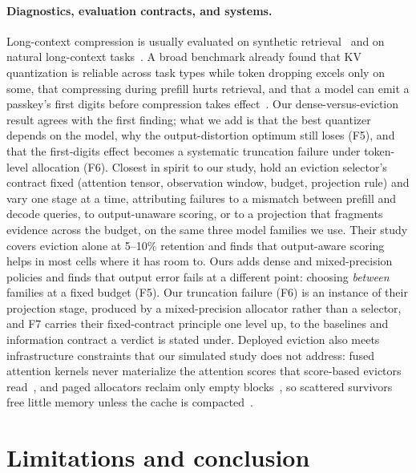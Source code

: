 \documentclass{article}
\theoremstyle{definition}
\begin{document}
\paragraph{Diagnostics, evaluation contracts, and systems.}
Long-context compression is usually evaluated on synthetic retrieval~\citep{hsieh2024ruler} and on natural long-context tasks~\citep{bai2025longbenchv2}.  A broad benchmark already found that KV quantization is reliable across task types while token dropping excels only on some, that compressing during prefill hurts retrieval, and that a model can emit a passkey's first digits before compression takes effect~\citep{yuan2024kvbench}.  Our dense-versus-eviction result agrees with the first finding; what we add is that the best quantizer depends on the model, why the output-distortion optimum still loses (F5), and that the first-digits effect becomes a systematic truncation failure under token-level allocation (F6).  Closest in spirit to our study, \citet{zhang2026fixedcontract} hold an eviction selector's contract fixed (attention tensor, observation window, budget, projection rule) and vary one stage at a time, attributing failures to a mismatch between prefill and decode queries, to output-unaware scoring, or to a projection that fragments evidence across the budget, on the same three model families we use.  Their study covers eviction alone at 5--10\% retention and finds that output-aware scoring helps in most cells where it has room to.  Ours adds dense and mixed-precision policies and finds that output error fails at a different point: choosing \emph{between} families at a fixed budget (F5).  Our truncation failure (F6) is an instance of their projection stage, produced by a mixed-precision allocator rather than a selector, and F7 carries their fixed-contract principle one level up, to the baselines and information contract a verdict is stated under.  Deployed eviction also meets infrastructure constraints that our simulated study does not address: fused attention kernels never materialize the attention scores that score-based evictors read~\citep{dao2023flashattention2,shah2024flashattention3,zhang2024sageattention}, and paged allocators reclaim only empty blocks~\citep{kwon2023vllm}, so scattered survivors free little memory unless the cache is compacted~\citep{mao2026triattention}.

\section{Limitations and conclusion}
\label{sec:conclusion}
\end{document}
